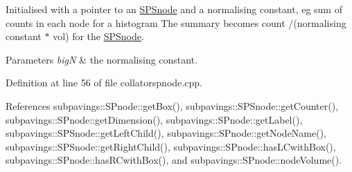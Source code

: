 \-Initialised with a pointer to an \hyperlink{classsubpavings_1_1SPSnode}{\-S\-P\-Snode} and a normalising constant, eg sum of counts in each node for a histogram \-The summary becomes count /(normalising constant $\ast$ vol) for the \hyperlink{classsubpavings_1_1SPSnode}{\-S\-P\-Snode}.


\begin{DoxyParams}{\-Parameters}
{\em big\-N} & the normalising constant. \\
\hline
\end{DoxyParams}


\-Definition at line 56 of file collatorspnode.\-cpp.



\-References subpavings\-::\-S\-Pnode\-::get\-Box(), subpavings\-::\-S\-P\-Snode\-::get\-Counter(), subpavings\-::\-S\-Pnode\-::get\-Dimension(), subpavings\-::\-S\-Pnode\-::get\-Label(), subpavings\-::\-S\-P\-Snode\-::get\-Left\-Child(), subpavings\-::\-S\-Pnode\-::get\-Node\-Name(), subpavings\-::\-S\-P\-Snode\-::get\-Right\-Child(), subpavings\-::\-S\-Pnode\-::has\-L\-Cwith\-Box(), subpavings\-::\-S\-Pnode\-::has\-R\-Cwith\-Box(), and subpavings\-::\-S\-Pnode\-::node\-Volume().


